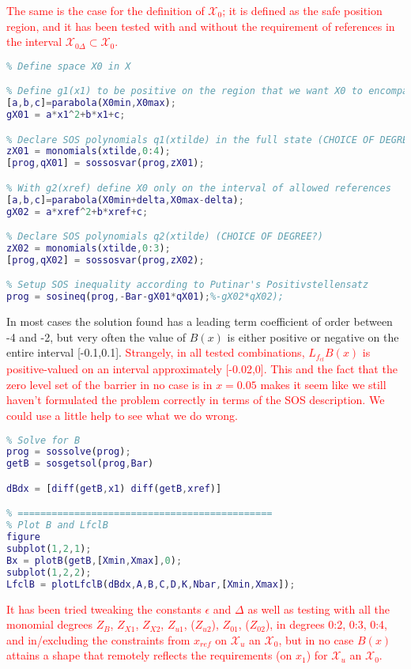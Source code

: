 \textcolor{red}{The same is the case for the definition of $\mathcal{X}_0$; it is defined as the safe position region, and it has been tested with and without the requirement of references in the interval $\mathcal{X}_{0\Delta} \subset \mathcal{X}_0$.}
\begin{lstlisting}[language=matlab]
% =============================================
% Define space X0 in X

% Define g1(x1) to be positive on the region that we want X0 to encompass
[a,b,c]=parabola(X0min,X0max);
gX01 = a*x1^2+b*x1+c;

% Declare SOS polynomials q1(xtilde) in the full state (CHOICE OF DEGREEE?)
zX01 = monomials(xtilde,0:4);
[prog,qX01] = sossosvar(prog,zX01);

% With g2(xref) define X0 only on the interval of allowed references
[a,b,c]=parabola(X0min+delta,X0max-delta);
gX02 = a*xref^2+b*xref+c;

% Declare SOS polynomials q2(xtilde) (CHOICE OF DEGREE?)
zX02 = monomials(xtilde,0:3);
[prog,qX02] = sossosvar(prog,zX02);

% Setup SOS inequality according to Putinar's Positivstellensatz
prog = sosineq(prog,-Bar-gX01*qX01);%-gX02*qX02);
\end{lstlisting}
In most cases the solution found has a leading term coefficient of order between -4 and -2, but very often the value of $B(x)$ is either positive or negative on the entire interval [-0.1,0.1]. \textcolor{red}{Strangely, in all tested combinations, $L_{f_{cl}}B(x)$ is positive-valued on an interval approximately [-0.02,0]. This and the fact that the zero level set of the barrier in no case is in $x=0.05$ makes it seem like we still haven't formulated the problem correctly in terms of the SOS description. We could use a little help to see what we do wrong.} 
\begin{lstlisting}[language=matlab]
% =============================================
% Solve for B
prog = sossolve(prog);
getB = sosgetsol(prog,Bar)

dBdx = [diff(getB,x1) diff(getB,xref)]

% =============================================
% Plot B and LfclB
figure
subplot(1,2,1);
Bx = plotB(getB,[Xmin,Xmax],0);
subplot(1,2,2);
LfclB = plotLfclB(dBdx,A,B,C,D,K,Nbar,[Xmin,Xmax]);
\end{lstlisting}

\textcolor{red}{It has been tried tweaking the constants $\epsilon$ and $\Delta$ as well as testing with all the monomial degrees $Z_B$, $Z_{X1}$, $Z_{X2}$, $Z_{u1}$, ($Z_{u2}$), $Z_{01}$, ($Z_{02}$), in degrees 0:2, 0:3, 0:4, and in/excluding the constraints from $x_{ref}$ on $\mathcal{X}_u$ an $\mathcal{X}_0$, but in no case $B(x)$ attains a shape that remotely reflects the requirements (on $x_1$) for $\mathcal{X}_u$ an $\mathcal{X}_0$.}

